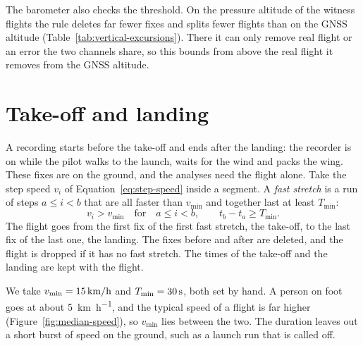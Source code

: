 The barometer also checks the threshold. On the pressure altitude of the witness flights
the rule deletes far fewer fixes and splits fewer flights than on the GNSS altitude
(Table~\ref{tab:vertical-excursions}). There it can only remove real flight or an error
the two channels share, so this bounds from above the real flight it removes from the
GNSS altitude.

\begin{table}[htbp]
\centering\small
\caption{The vertical excursion rule with the top vertical speed $v_{z,\max}$ and the
window $W=\SI{\cfgExcursionWindowS}{\second}$, in the flights kept by the previous steps:
on the GNSS altitude of every flight, and on the pressure altitude of the flights whose
barometer is a witness (Section~\ref{sec:altchannel}). Flights split: share of the
flights split at least once. Fixes deleted: share of the fixes the rule receives that it
deletes.}
\label{tab:vertical-excursions}

\end{table}

\section{Take-off and landing}
\label{sec:airborne}

A recording starts before the take-off and ends after the landing: the recorder is on
while the pilot walks to the launch, waits for the wind and packs the wing. These fixes
are on the ground, and the analyses need the flight alone. Take the step speed $v_i$ of
Equation~\eqref{eq:step-speed} inside a segment. A \emph{fast
stretch} is a run of steps $a\leq i<b$ that are all faster than $v_{\min}$ and together
last at least $T_{\min}$:
\begin{equation}
  v_i>v_{\min}\quad\text{for}\quad a\leq i<b,\qquad t_b-t_a\geq T_{\min}.
  \label{eq:airborne}
\end{equation}
The flight goes from the first fix of the first fast stretch, the take-off, to the last
fix of the last one, the landing. The fixes before and after are deleted, and the
flight is dropped if it has no fast stretch. The times of the take-off and the landing
are kept with the flight.

We take $v_{\min}=\SI[per-mode=symbol]{\cfgAirborneMinKmh}{\kilo\metre\per\hour}$ and
$T_{\min}=\SI{\cfgAirborneMinS}{\second}$, both set by hand. A person on foot goes at
about \SI[per-mode=symbol]{5}{\kilo\metre\per\hour}, and the typical speed of a flight
is far higher (Figure~\ref{fig:median-speed}), so $v_{\min}$ lies between the two. The
duration leaves out a short burst of speed on the ground, such as a launch run that is called off.

